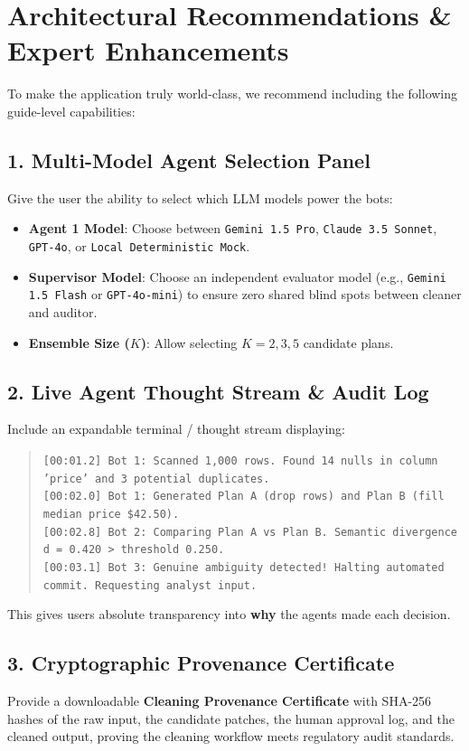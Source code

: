 \documentclass[11pt,a4paper]{article}
\begin{document}
\section{Architectural Recommendations \& Expert Enhancements}
\label{sec:recommendations}

To make the application truly world-class, we recommend including the following guide-level capabilities:

\subsection{1. Multi-Model Agent Selection Panel}
Give the user the ability to select which LLM models power the bots:
\begin{itemize}
    \item \textbf{Agent 1 Model}: Choose between \texttt{Gemini 1.5 Pro}, \texttt{Claude 3.5 Sonnet}, \texttt{GPT-4o}, or \texttt{Local Deterministic Mock}.
    \item \textbf{Supervisor Model}: Choose an independent evaluator model (e.g., \texttt{Gemini 1.5 Flash} or \texttt{GPT-4o-mini}) to ensure zero shared blind spots between cleaner and auditor.
    \item \textbf{Ensemble Size ($K$)}: Allow selecting $K=2, 3, 5$ candidate plans.
\end{itemize}

\subsection{2. Live Agent Thought Stream \& Audit Log}
Include an expandable terminal / thought stream displaying:
\begin{quote}
\texttt{[00:01.2] Bot 1: Scanned 1,000 rows. Found 14 nulls in column 'price' and 3 potential duplicates.}\\
\texttt{[00:02.0] Bot 1: Generated Plan A (drop rows) and Plan B (fill median price \$42.50).}\\
\texttt{[00:02.8] Bot 2: Comparing Plan A vs Plan B. Semantic divergence d = 0.420 > threshold 0.250.}\\
\texttt{[00:03.1] Bot 3: Genuine ambiguity detected! Halting automated commit. Requesting analyst input.}
\end{quote}
This gives users absolute transparency into \textbf{why} the agents made each decision.

\subsection{3. Cryptographic Provenance Certificate}
Provide a downloadable \textbf{Cleaning Provenance Certificate} with SHA-256 hashes of the raw input, the candidate patches, the human approval log, and the cleaned output, proving the cleaning workflow meets regulatory audit standards.
\end{document}
